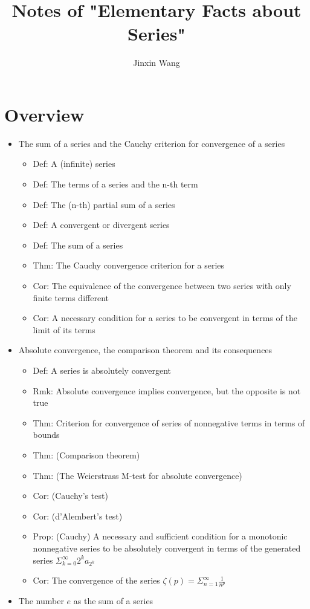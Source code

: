 \documentclass[onecolumn]{ctexart}
\title{Notes of "Elementary Facts about Series"}
\author{Jinxin Wang}
\date{}
\begin{document}
\maketitle

\section{Overview}
\begin{itemize}
  \item The sum of a series and the Cauchy criterion for convergence of a series
  \begin{itemize}
    \item Def: A (infinite) series
    \item Def: The terms of a series and the n-th term
    \item Def: The (n-th) partial sum of a series
    \item Def: A convergent or divergent series
    \item Def: The sum of a series
    \item Thm: The Cauchy convergence criterion for a series
    \item Cor: The equivalence of the convergence between two series with only finite terms different
    \item Cor: A necessary condition for a series to be convergent in terms of the limit of its terms
  \end{itemize}
  \item Absolute convergence, the comparison theorem and its consequences
  \begin{itemize}
    \item Def: A series is absolutely convergent
    \item Rmk: Absolute convergence implies convergence, but the opposite is not true
    \item Thm: Criterion for convergence of series of nonnegative terms in terms of bounds
    \item Thm: (Comparison theorem)
    \item Thm: (The Weierstrass M-test for absolute convergence)
    \item Cor: (Cauchy's test)
    \item Cor: (d'Alembert's test)
    \item Prop: (Cauchy) A necessary and sufficient condition for a monotonic nonnegative series to be absolutely convergent in terms of the generated series $\Sigma_{k=0}^{\infty}2^ka_{2^k}$
    \item Cor: The convergence of the series $\zeta(p) = \Sigma_{n=1}^{\infty} \frac{1}{n^p}$
  \end{itemize}
  \item The number $e$ as the sum of a series
\end{itemize}
\end{document}
